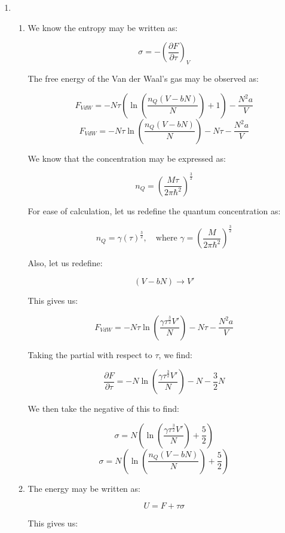\begin{enumerate}

  \item

    \begin{enumerate}

      \item 

        We know the entropy may be written as:

        $$\sigma=-\left( \frac{\partial F}{\partial \tau} \right)_V$$

        The free energy of the Van der Waal's gas may be observed as:

        $$F_{VdW}=-N\tau\left( \ln\left( \frac{n_Q(V-bN)}{N} \right)+1 \right)-\frac{N^2a}{V}$$
        $$F_{VdW}=-N\tau\ln\left( \frac{n_Q(V-bN)}{N} \right)-N\tau-\frac{N^2a}{V}$$

        We know that the concentration may be expressed as:

        $$n_Q=\left( \frac{M\tau}{2\pi\hbar^2} \right)^{\frac{3}{2}}$$

        For ease of calculation, let us redefine the quantum concentration as:

        $$n_Q=\gamma\left(\tau\right)^{\frac{3}{2}},\quad\text{where }\gamma=\left( \frac{M}{2\pi\hbar^2} \right)^{\frac{3}{2}}$$

        Also, let us redefine:

        $$(V-bN)\to V'$$

        This gives us:

        $$F_{VdW}=-N\tau\ln\left( \frac{\gamma\tau^{\frac{3}{2}}V'}{N} \right)-N\tau-\frac{N^2a}{V}$$

        Taking the partial with respect to $\tau$, we find:

        $$\frac{\partial F}{\partial \tau}=-N\ln\left( \frac{\gamma\tau^{\frac{3}{2}}V'}{N} \right)-N-\frac{3}{2}N$$

        We then take the negative of this to find:

        $$\sigma=N\left( \ln\left( \frac{\gamma\tau^{\frac{3}{2}}V'}{N} \right)+\frac{5}{2} \right)$$
        $$\boxed{\sigma=N\left( \ln\left( \frac{n_Q(V-bN)}{N} \right)+\frac{5}{2} \right)}$$

      \item 

        The energy may be written as:

        $$U=F+\tau\sigma$$

        This gives us:


\end{enumerate}
\end{enumerate}
